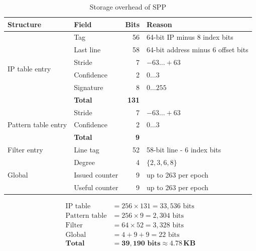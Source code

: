 \documentclass[11pt,a4paper]{article}
\begin{document}
  \begin{table}[H]
    \centering
    \caption{Storage overhead of SPP}
    \label{tab:storage}
    \begin{tabular}{@{}llrl@{}}
      \toprule
      \textbf{Structure} & \textbf{Field} & \textbf{Bits} &
      \textbf{Reason} \\
      \midrule
      \multirow{6}{*}{IP table entry}
        & Tag            & 56  & 64-bit IP minus 8 index bits \\
        & Last line      & 58  & 64-bit address minus 6 offset bits \\
        & Stride         & 7   & $-63 \ldots +63$ \\
        & Confidence     & 2   & $0 \ldots 3$ \\
        & Signature      & 8   & $0 \ldots 255$ \\
        & \textbf{Total} & \textbf{131} & \\
      \midrule
      \multirow{3}{*}{Pattern table entry}
        & Stride         & 7   & $-63 \ldots +63$ \\
        & Confidence     & 2   & $0 \ldots 3$ \\
        & \textbf{Total} & \textbf{9} & \\
      \midrule
      Filter entry
        & Line tag       & 52  & 58-bit line - 6 index bits \\
      \midrule
      \multirow{3}{*}{Global}
        & Degree         & 4   & $\{2, 3, 6, 8\}$ \\
        & Issued counter & 9   & up to 263 per epoch \\
        & Useful counter & 9   & up to 263 per epoch \\
      \bottomrule
    \end{tabular}
  \end{table}

  \begin{align*}
    \text{IP table}      &= 256 \times 131 = 33{,}536 \text{ bits} \\
    \text{Pattern table} &= 256 \times 9   = 2{,}304 \text{ bits} \\
    \text{Filter}        &= 64  \times 52  = 3{,}328 \text{ bits} \\
    \text{Global}        &= 4 + 9 + 9      = 22 \text{ bits} \\
    \textbf{Total}       &= \mathbf{39{,}190 \text{ bits}
                            \approx 4.78\,KB}
  \end{align*}
\end{document}
